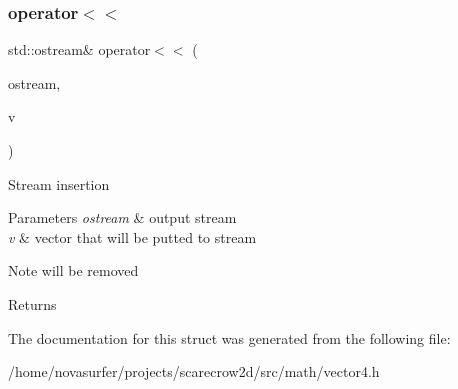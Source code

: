 \subsubsection{\texorpdfstring{operator$<$$<$}{operator<<}}
{\footnotesize\ttfamily std\+::ostream\& operator$<$$<$ (\begin{DoxyParamCaption}\item[{std\+::ostream \&}]{ostream,  }\item[{const \hyperlink{structmath_1_1vec4}{vec4} \&}]{v }\end{DoxyParamCaption})\hspace{0.3cm}{\ttfamily [friend]}}

Stream insertion 
\begin{DoxyParams}{Parameters}
{\em ostream} & output stream \\
\hline
{\em v} & vector that will be putted to stream \\
\hline
\end{DoxyParams}
\begin{DoxyNote}{Note}
will be removed 
\end{DoxyNote}
\begin{DoxyReturn}{Returns}

\end{DoxyReturn}


The documentation for this struct was generated from the following file\+:\begin{DoxyCompactItemize}
\item 
/home/novasurfer/projects/scarecrow2d/src/math/vector4.\+h\end{DoxyCompactItemize}
